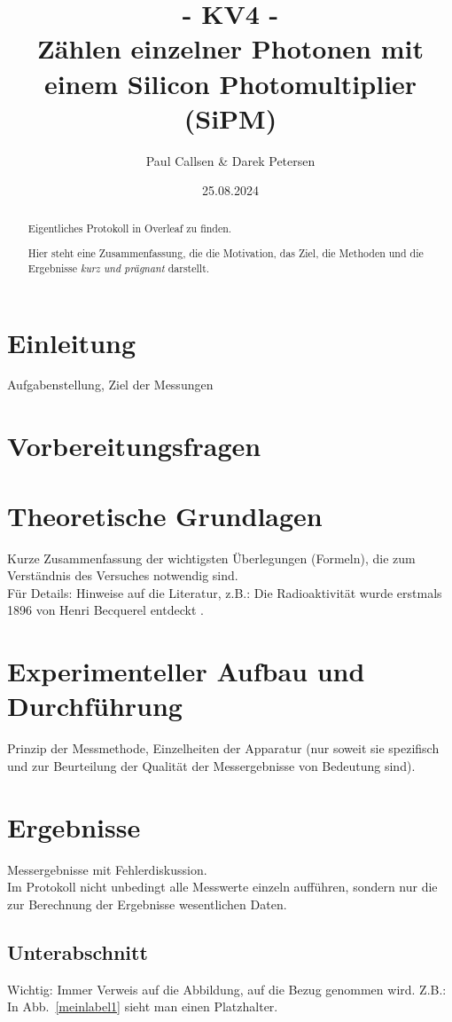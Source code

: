 \documentclass[12pt]{article}
\title{- KV4 - \\ Zählen einzelner Photonen mit einem Silicon Photomultiplier (SiPM)}
\author{Paul Callsen & Darek Petersen}
\date{25.08.2024}
\begin{document}
\maketitle
\thispagestyle{empty}
\clearpage

\begin{abstract}
Eigentliches Protokoll in Overleaf zu finden.

  Hier steht eine Zusammenfassung, die die Motivation, das Ziel, die Methoden und die Ergebnisse \emph{kurz und pr\"agnant} darstellt.
\end{abstract}

\section{Einleitung}
Aufgabenstellung, Ziel der Messungen
\section{Vorbereitungsfragen}


\section{Theoretische Grundlagen}
Kurze Zusammenfassung der wichtigsten Überlegungen (Formeln), die zum Verständnis des Versuches notwendig sind.\\
Für Details: Hinweise auf die Literatur, z.B.:
Die Radioaktivität wurde erstmals 1896 von Henri Becquerel entdeckt \cite{Becquerel:261888}.


\section{Experimenteller Aufbau und Durchführung}
Prinzip der Messmethode, Einzelheiten der Apparatur (nur soweit sie spezifisch und zur Beurteilung der Qualität der Messergebnisse von Bedeutung sind).

\section{Ergebnisse}
Messergebnisse mit Fehlerdiskussion.\\
Im Protokoll nicht unbedingt alle Messwerte einzeln aufführen, sondern nur die zur Berechnung der Ergebnisse wesentlichen Daten. \\


\subsection{Unterabschnitt}
Wichtig: Immer Verweis auf die Abbildung, auf die Bezug genommen wird.
Z.B.: In Abb.~\ref{meinlabel1} sieht man einen Platzhalter.
\end{document}
